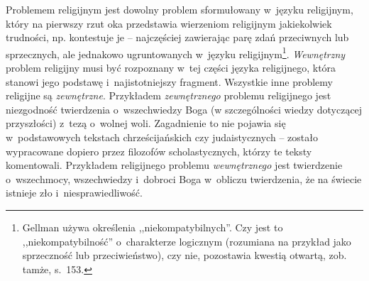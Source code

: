 Problemem religijnym jest dowolny problem sformułowany w~języku religijnym, który na pierwszy rzut oka przedstawia wierzeniom religijnym jakiekolwiek trudności, np. kontestuje je -- najczęściej zawierając parę zdań przeciwnych lub sprzecznych, ale jednakowo ugruntowanych w~języku religijnym\footnote{Gellman używa określenia ,,niekompatybilnych''. Czy jest to ,,niekompatybilność'' o~charakterze logicznym (rozumiana na przykład jako sprzeczność lub przeciwieństwo), czy nie, pozostawia kwestią otwartą, zob. tamże, s.~153.}. \textit{Wewnętrzny} problem religijny musi być rozpoznany w~tej części języka religijnego, która stanowi jego podstawę i~najistotniejszy fragment. Wszystkie inne problemy religijne są \textit{zewnętrzne}. Przykładem \textit{zewnętrznego} problemu religijnego jest niezgodność twierdzenia o~wszechwiedzy Boga (w szczególności wiedzy dotyczącej przyszłości) z~tezą o~wolnej woli. Zagadnienie to nie pojawia się w~podstawowych tekstach chrześcijańskich czy judaistycznych -- zostało wypracowane dopiero przez filozofów scholastycznych, którzy te teksty komentowali. Przykładem religijnego problemu \textit{wewnętrznego} jest twierdzenie o~wszechmocy, wszechwiedzy i~dobroci Boga w~obliczu twierdzenia, że na świecie istnieje zło i~niesprawiedliwość.

